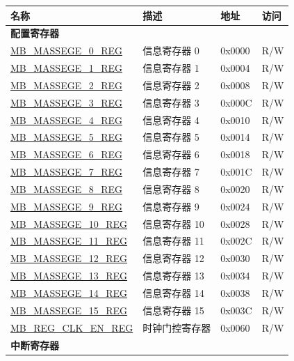 \begin{longtable}{ | p{6cm} | p{7.2cm} | p{1.3cm} | p{1cm} | }
\hline\rowcolor{lightgray}
名称 & 描述 &  地址 & 访问 \\ \hline
\endhead
\multicolumn{4}{|l|}{\textbf{配置寄存器}} \\ \hline
\hyperref[regdesc:MBMESSAGE0REG]{MB\_MASSEGE\_0\_REG} & 信息寄存器 0 & 0x0000 & R/W \\ \hline
\hyperref[regdesc:MBMESSAGE1REG]{MB\_MASSEGE\_1\_REG} & 信息寄存器 1 & 0x0004 & R/W \\ \hline
\hyperref[regdesc:MBMESSAGE2REG]{MB\_MASSEGE\_2\_REG} & 信息寄存器 2 & 0x0008 & R/W \\ \hline
\hyperref[regdesc:MBMESSAGE3REG]{MB\_MASSEGE\_3\_REG} & 信息寄存器 3& 0x000C & R/W \\ \hline
\hyperref[regdesc:MBMESSAGE4REG]{MB\_MASSEGE\_4\_REG} & 信息寄存器 4& 0x0010 & R/W \\ \hline
\hyperref[regdesc:MBMESSAGE5REG]{MB\_MASSEGE\_5\_REG} & 信息寄存器 5& 0x0014 & R/W \\ \hline
\hyperref[regdesc:MBMESSAGE6REG]{MB\_MASSEGE\_6\_REG} & 信息寄存器 6& 0x0018 & R/W \\ \hline
\hyperref[regdesc:MBMESSAGE7REG]{MB\_MASSEGE\_7\_REG} & 信息寄存器 7& 0x001C & R/W \\ \hline
\hyperref[regdesc:MBMESSAGE8REG]{MB\_MASSEGE\_8\_REG} & 信息寄存器 8& 0x0020 & R/W \\ \hline
\hyperref[regdesc:MBMESSAGE9REG]{MB\_MASSEGE\_9\_REG} & 信息寄存器 9& 0x0024 & R/W \\ \hline
\hyperref[regdesc:MBMESSAGE10REG]{MB\_MASSEGE\_10\_REG} & 信息寄存器 10& 0x0028 & R/W \\ \hline
\hyperref[regdesc:MBMESSAGE11REG]{MB\_MASSEGE\_11\_REG} & 信息寄存器 11& 0x002C & R/W \\ \hline
\hyperref[regdesc:MBMESSAGE12REG]{MB\_MASSEGE\_12\_REG} & 信息寄存器 12& 0x0030 & R/W \\ \hline
\hyperref[regdesc:MBMESSAGE13REG]{MB\_MASSEGE\_13\_REG} & 信息寄存器 13& 0x0034 & R/W \\ \hline
\hyperref[regdesc:MBMESSAGE14REG]{MB\_MASSEGE\_14\_REG} & 信息寄存器 14& 0x0038 & R/W \\ \hline
\hyperref[regdesc:MBMESSAGE15REG]{MB\_MASSEGE\_15\_REG} & 信息寄存器 15& 0x003C & R/W \\ \hline
\hyperref[regdesc:MBREGCLKENREG]{MB\_REG\_CLK\_EN\_REG} & 时钟门控寄存器 & 0x0060 & R/W \\ \hline
\multicolumn{4}{|l|}{\textbf{中断寄存器}} \\ \hline

\end{longtable}
